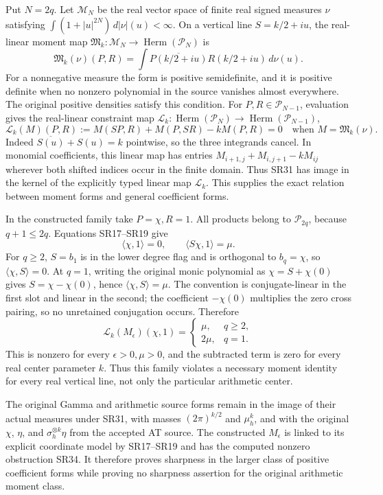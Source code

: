 \documentclass{article}
\begin{document}
Put \(N=2q\). Let \(\mathcal M_N\) be the real vector space of finite real signed measures \(\nu\) satisfying \(\int(1+|u|^{2N})\,d|\nu|(u)<\infty\). On a vertical line \(S=k/2+iu\), the real-linear moment map \(\mathfrak M_k:\mathcal M_N\to\operatorname{Herm}(\mathcal P_N)\) is \[
\mathfrak M_k(\nu)(P,R)
=\int\overline{P(k/2+iu)}R(k/2+iu)\,d\nu(u).
\tag{SR31}
\] For a nonnegative measure the form is positive semidefinite, and it is positive definite when no nonzero polynomial in the source vanishes almost everywhere. The original positive densities satisfy this condition. For \(P,R\in\mathcal P_{N-1}\), evaluation gives the real-linear constraint map \(\mathcal L_k:\operatorname{Herm}(\mathcal P_N)\to\operatorname{Herm}(\mathcal P_{N-1})\), \[
\mathcal L_k(M)(P,R)
:=M(SP,R)+M(P,SR)-kM(P,R)=0
\quad\text{when }M=\mathfrak M_k(\nu).
\tag{SR32}
\] Indeed \(\overline{S(u)}+S(u)=k\) pointwise, so the three integrands cancel. In monomial coefficients, this linear map has entries \(M_{i+1,j}+M_{i,j+1}-kM_{ij}\) wherever both shifted indices occur in the finite domain. Thus SR31 has image in the kernel of the explicitly typed linear map \(\mathcal L_k\). This supplies the exact relation between moment forms and general coefficient forms.

In the constructed family take \(P=\chi,R=1\). All products belong to \(\mathcal P_{2q}\), because \(q+1\le2q\). Equations SR17--SR19 give \[
\langle\chi,1\rangle=0,\qquad
\langle S\chi,1\rangle=\mu.
\tag{SR33}
\] For \(q\ge2\), \(S=b_1\) is in the lower degree flag and is orthogonal to \(b_q=\chi\), so \(\langle\chi,S\rangle=0\). At \(q=1\), writing the original monic polynomial as \(\chi=S+\chi(0)\) gives \(S=\chi-\chi(0)\), hence \(\langle\chi,S\rangle=\mu\). The convention is conjugate-linear in the first slot and linear in the second; the coefficient \(-\chi(0)\) multiplies the zero cross pairing, so no unretained conjugation occurs. Therefore \[
\mathcal L_k(M_\epsilon)(\chi,1)
=\begin{cases}\mu,&q\ge2,\\2\mu,&q=1.\end{cases}
\tag{SR34}
\] This is nonzero for every \(\epsilon>0,\mu>0\), and the subtracted term is zero for every real center parameter \(k\). Thus this family violates a necessary moment identity for every real vertical line, not only the particular arithmetic center.

The original Gamma and arithmetic source forms remain in the image of their actual measures under SR31, with masses \((2\pi)^{k/2}\) and \(\mu_h^k\), and with the original \(\chi\), \(\eta\), and \(\sigma_h^{\otimes k}\eta\) from the accepted AT source. The constructed \(M_\epsilon\) is linked to its explicit coordinate model by SR17--SR19 and has the computed nonzero obstruction SR34. It therefore proves sharpness in the larger class of positive coefficient forms while proving no sharpness assertion for the original arithmetic moment class.
\end{document}
